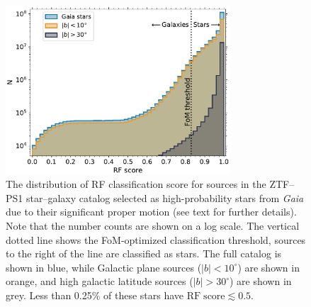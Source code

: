 \documentclass[twocolumn]{aastex62}
\begin{document}
\begin{CJK*}{UTF8}{gbsn}
\begin{figure}[htb]
 \centering
  \includegraphics[width=3.3in]{./Figures/Gaia_PS1_pm_hist.pdf}
  \caption{ 
  The distribution of RF classification score for sources in the ZTF--PS1
  star--galaxy catalog selected as high-probability stars from \textit{Gaia}
  due to their significant proper motion (see text for further details).
  Note that the number counts are shown on a log scale. The vertical dotted
  line shows the FoM-optimized classification threshold, sources to the
  right of the line are classified as stars. The full catalog is shown in
  blue, while Galactic plane sources ($|b| < 10^{\circ}$) are shown in
  orange, and high galactic latitude sources ($|b| > 30^{\circ}$) are shown
  in grey. Less than 0.25\% of these stars have $\mathrm{RF\;score} \lesssim
  0.5$.
  }
  \label{fig:gaia}
\end{figure}


\end{CJK*}
\end{document}
